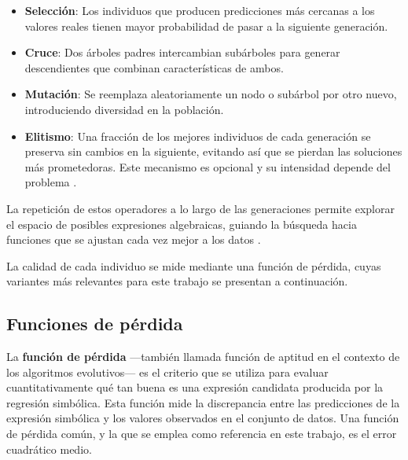 \begin{itemize} \item \textbf{Selección}: Los individuos que producen predicciones más cercanas a los valores reales tienen mayor probabilidad de pasar a la siguiente generación.

	\item \textbf{Cruce}: Dos árboles padres intercambian subárboles para generar descendientes que combinan características de ambos.

	\item \textbf{Mutación}: Se reemplaza aleatoriamente un nodo o subárbol por otro nuevo, introduciendo diversidad en la población.

	\item \textbf{Elitismo}: Una fracción de los mejores individuos de cada generación se preserva sin cambios en la siguiente, evitando así que se pierdan las soluciones más prometedoras. Este mecanismo es opcional y su intensidad depende del problema \cite{koza1992genetic}. \end{itemize}

La repetición de estos operadores a lo largo de las generaciones permite explorar el espacio de posibles expresiones algebraicas, guiando la búsqueda hacia funciones que se ajustan cada vez mejor a los datos \cite{koza1992genetic}.

La calidad de cada individuo se mide mediante una función de pérdida, cuyas variantes más relevantes para este trabajo se presentan a continuación.

\subsection{Funciones de pérdida}

La \textbf{función de pérdida} ---también llamada función de aptitud en el contexto de los algoritmos evolutivos--- es el criterio que se utiliza para evaluar cuantitativamente qué tan buena es una expresión candidata producida por la regresión simbólica. Esta función mide la discrepancia entre las predicciones de la expresión simbólica y los valores observados en el conjunto de datos. Una función de pérdida común, y la que se emplea como referencia en este trabajo, es el error cuadrático medio.

